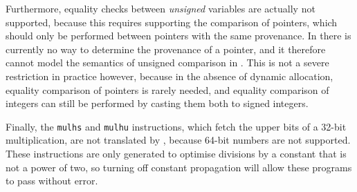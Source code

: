 Furthermore, equality checks between \emph{unsigned} variables are actually not supported, because this requires supporting the comparison of pointers, which should only be performed between pointers with the same provenance.  In \vericert{} there is currently no way to determine the provenance of a pointer, and it therefore cannot model the semantics of unsigned comparison in \compcert{}. This is not a severe restriction in practice however, because in the absence of dynamic allocation, equality comparison of pointers is rarely needed, and equality comparison of integers can still be performed by casting them both to signed integers.

Finally, the \texttt{mulhs} and \texttt{mulhu} instructions, which fetch the upper bits of a 32-bit multiplication, are not translated by \vericert{}, because 64-bit numbers are not supported. These instructions are only generated to optimise divisions by a constant that is not a power of two, so turning off constant propagation will allow these programs to pass without error.

